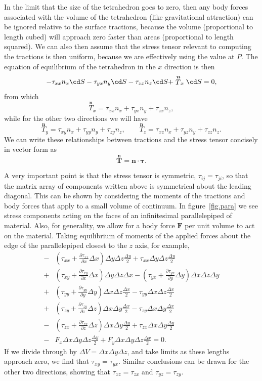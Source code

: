 \documentclass[a4paper,11pt]		{report}
\begin{document}
In the limit that the size of the tetrahedron goes to zero, then any
body forces associated with the volume of the tetrahedron (like
gravitational attraction) can be ignored relative to the surface
tractions, because the volume (proportional to length cubed) will
approach zero faster than areas (proportional to length squared). We
can also then assume that the stress tensor relevant to computing the
tractions is then uniform, because we are effectively using the value
at $P$. The equation of equilibrium of the tetrahedron in the $x$
direction is then
\[
-\tau_{xx}n_x\cd S -\tau_{yx}n_y\cd S -\tau_{zx}n_z\cd S +
 \stackrel{\bm{n}}{T}_x\cd S = 0,
\]
from which
\[
\stackrel{\bm{n}}{T}_x = \tau_{xx}n_x + \tau_{yx}n_y + \tau_{zx}n_z,
\]
while for the other two directions we will have 
\[
\stackrel{\bm{n}}{T}_y = \tau_{xy}n_x + \tau_{yy}n_y + \tau_{zy}n_z,\qquad
\stackrel{\bm{n}}{T}_z = \tau_{xz}n_x + \tau_{yz}n_y + \tau_{zz}n_z.
\]
We can write these relationships between tractions and the stress
tensor concisely in vector form as
\[
\stackrel{\bm{n}}{\bm{T}} = \bm{n\cdot\tau}.
\]

A very important point is that the stress tensor is symmetric, \ie
$\tau_{ij}=\tau_{ji}$, so that the matrix array of components written
above is symmetrical about the leading diagonal. This can be shown by
considering the moments of the tractions and body forces that apply to
a small volume of continuum. In figure~\ref{fig.para} we see stress
components acting on the faces of an infinitesimal parallelepiped of
material. Also, for generality, we allow for a body force $\bm{F}$ per
unit volume to act on the material. Taking equilibrium of moments of
the applied forces about the edge of the parallelepiped closest to the
$z$ axis, for example,
\begin{align*}
-&\left(\tau_{xx}+\frac{\partial\tau_{xx}}{\partial x}\Delta x\right)
 \Delta y\Delta z\frac{\Delta y}{2} +
 \tau_{xx}\Delta y\Delta z\frac{\Delta y}{2}\\
+&\left(\tau_{xy}+\frac{\partial\tau_{xy}}{\partial x}\Delta x\right)
 \Delta y\Delta z\Delta x -
 \left(\tau_{yx}+\frac{\partial\tau_{yx}}{\partial y}\Delta y\right)
 \Delta x\Delta z\Delta y\\
+&\left(\tau_{yy}+\frac{\partial\tau_{yy}}{\partial y}\Delta y\right)
 \Delta x\Delta z\frac{\Delta x}{2} -
 \tau_{yy}\Delta x\Delta z\frac{\Delta x}{2}\\
+&\left(\tau_{zy}+\frac{\partial\tau_{zy}}{\partial z}\Delta z\right)
 \Delta x\Delta y\frac{\Delta x}{2} -
 \tau_{zy}\Delta x\Delta y\frac{\Delta x}{2}\\
-&\left(\tau_{zx}+\frac{\partial\tau_{zx}}{\partial z}\Delta z\right)
 \Delta x\Delta y\frac{\Delta y}{2} +
 \tau_{zx}\Delta x\Delta y\frac{\Delta y}{2}\\
-&F_x\Delta x\Delta y\Delta z\frac{\Delta y}{2}
+F_y\Delta x\Delta y\Delta z\frac{\Delta x}{2} = 0.
\end{align*}
If we divide through by $\Delta V=\Delta x\Delta y\Delta z$, and take
limits as these lengths approach zero, we find that
$\tau_{xy}=\tau_{yx}$. Similar conclusions can be drawn for the other
two directions, showing that $\tau_{xz}=\tau_{zx}$ and
$\tau_{yz}=\tau_{zy}$.
\end{document}
